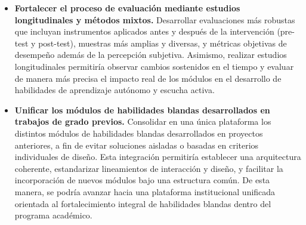 \begin{itemize}
    \item \textbf{Fortalecer el proceso de evaluación mediante estudios longitudinales y métodos mixtos.}  
    Desarrollar evaluaciones más robustas que incluyan instrumentos aplicados antes y después de la intervención (pre-test y post-test), muestras más amplias y diversas, y métricas objetivas de desempeño además de la percepción subjetiva. Asimismo, realizar estudios longitudinales permitiría observar cambios sostenidos en el tiempo y evaluar de manera más precisa el impacto real de los módulos en el desarrollo de habilidades de aprendizaje autónomo y escucha activa.

    \item \textbf{Unificar los módulos de habilidades blandas desarrollados en trabajos de grado previos.}  
    Consolidar en una única plataforma los distintos módulos de habilidades blandas desarrollados en proyectos anteriores, a fin de evitar soluciones aisladas o basadas en criterios individuales de diseño. Esta integración permitiría establecer una arquitectura coherente, estandarizar lineamientos de interacción y diseño, y facilitar la incorporación de nuevos módulos bajo una estructura común. De esta manera, se podría avanzar hacia una plataforma institucional unificada orientada al fortalecimiento integral de habilidades blandas dentro del programa académico.

\end{itemize}

